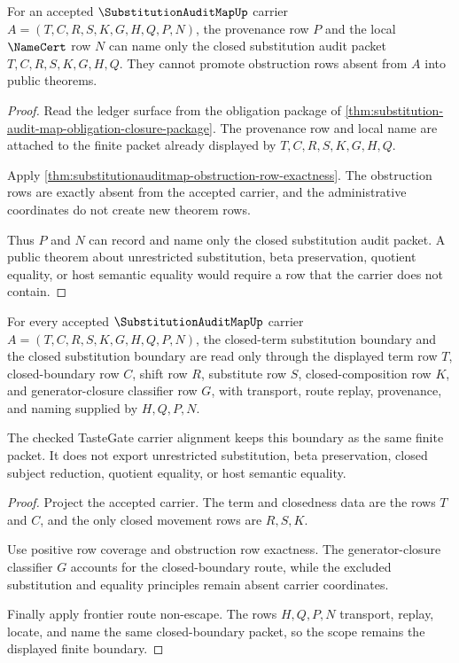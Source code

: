 \begin{theorem}
\label{thm:substitution-audit-map-ledger-nonescape}
For an accepted $\SubstitutionAuditMapUp$ carrier $A=(T,C,R,S,K,G,H,Q,P,N)$, the provenance row $P$ and the local $\NameCert$ row $N$ can name only the closed substitution audit packet $T,C,R,S,K,G,H,Q$. They cannot promote obstruction rows absent from $A$ into public theorems.
\end{theorem}
\begin{proof}
Read the ledger surface from the obligation package of \autoref{thm:substitution-audit-map-obligation-closure-package}. The provenance row and local name are attached to the finite packet already displayed by $T,C,R,S,K,G,H,Q$.

Apply \autoref{thm:substitutionauditmap-obstruction-row-exactness}. The obstruction rows are exactly absent from the accepted carrier, and the administrative coordinates do not create new theorem rows.

Thus $P$ and $N$ can record and name only the closed substitution audit packet. A public theorem about unrestricted substitution, beta preservation, quotient equality, or host semantic equality would require a row that the carrier does not contain.
\end{proof}

\begin{theorem}
\label{thm:substitutionauditmap-closed-boundary-scope}
For every accepted $\SubstitutionAuditMapUp$ carrier $A=(T,C,R,S,K,G,H,Q,P,N)$, the closed-term substitution boundary and the closed substitution boundary are read only through the displayed term row $T$, closed-boundary row $C$, shift row $R$, substitute row $S$, closed-composition row $K$, and generator-closure classifier row $G$, with transport, route replay, provenance, and naming supplied by $H,Q,P,N$.

The checked TasteGate carrier alignment keeps this boundary as the same finite packet. It does not export unrestricted substitution, beta preservation, closed subject reduction, quotient equality, or host semantic equality.
\end{theorem}
\begin{proof}
Project the accepted carrier. The term and closedness data are the rows $T$ and $C$, and the only closed movement rows are $R,S,K$.

Use positive row coverage and obstruction row exactness. The generator-closure classifier $G$ accounts for the closed-boundary route, while the excluded substitution and equality principles remain absent carrier coordinates.

Finally apply frontier route non-escape. The rows $H,Q,P,N$ transport, replay, locate, and name the same closed-boundary packet, so the scope remains the displayed finite boundary.
\end{proof}

